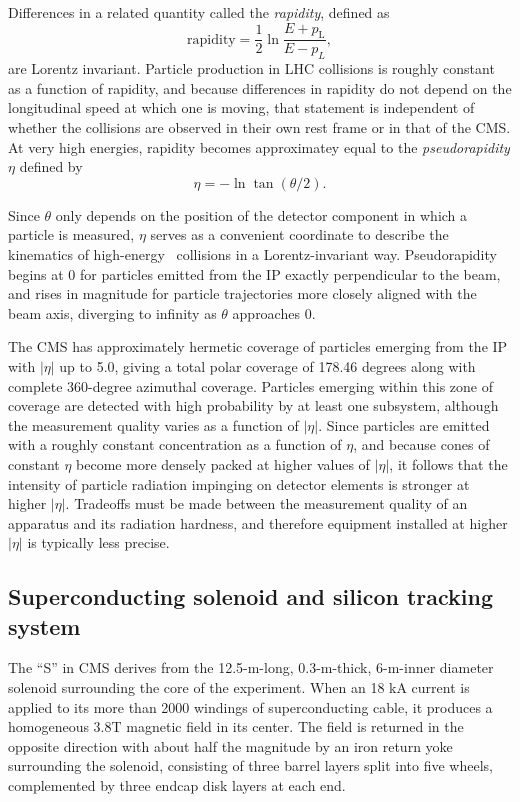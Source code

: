 \documentclass[oneside, letterpaper, 12pt, oldfontcommands]{memoir}
\begin{document}
Differences in a related quantity called the \textit{rapidity}, defined as
\begin{equation}
\mathrm{rapidity} = \frac{1}{2}\ln{\frac{E+p_\mathrm{L}}{E-p_{L}}},
\label{eq:rapidity}
\end{equation}
are Lorentz invariant. Particle production in LHC collisions is roughly constant as a function of rapidity, and because
differences in rapidity do not depend on the longitudinal speed at which one is moving, that statement is independent
of whether the collisions are observed in their own rest frame or in that of the CMS. At very high
energies, rapidity becomes approximatey equal to the \textit{pseudorapidity} $\eta$ defined by
\begin{equation}
\eta = -\ln{\tan{(\theta/2)}}.
\label{eq:pseudorapidity}
\end{equation}

Since $\theta$ only depends on the position of the detector component in which a particle is measured, $\eta$
serves as a convenient coordinate to describe the kinematics of high-energy \Pp\Pp\ collisions in a Lorentz-invariant way.
Pseudorapidity begins at 0 for particles emitted from the IP exactly perpendicular to the beam, and rises in magnitude for particle
trajectories more closely aligned with the beam axis, diverging to infinity as $\theta$ approaches 0.

The CMS has approximately hermetic coverage of particles emerging from the IP with $|\eta|$
up to 5.0, giving a total polar coverage of 178.46 degrees along with complete 360-degree azimuthal coverage. Particles emerging
within this zone of coverage are detected with high probability by at least one subsystem, although the measurement quality varies
as a function of $|\eta|$. Since particles are emitted with a roughly constant concentration as a function of $\eta$, and because
cones of constant $\eta$ become more densely packed at higher values of $|\eta|$, it follows that the intensity of particle radiation
impinging on detector elements is stronger at higher $|\eta|$. Tradeoffs must be made between the measurement quality of an apparatus
and its radiation hardness, and therefore equipment installed at higher $|\eta|$ is typically less precise.

\subsection{Superconducting solenoid and silicon tracking system} \label{sec:LHCCMS_CMS_magnet_tracker}
The ``S'' in CMS derives from the 12.5-m-long, 0.3-m-thick, 6-m-inner diameter solenoid surrounding the core of the experiment.
When an 18 kA current is applied to its more than 2000 windings of superconducting cable, it produces a homogeneous 3.8\unit{T} magnetic
field in its center. The field is returned in the opposite direction with about half the magnitude by an iron return yoke surrounding
the solenoid, consisting of three barrel layers split into five wheels, complemented by three endcap disk layers at each end.
\end{document}
